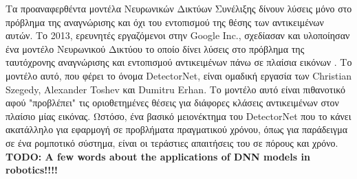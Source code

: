 Τα προαναφερθέντα μοντέλα Νευρωνικών Δικτύων Συνέλιξης δίνουν
λύσεις μόνο στο πρόβλημα της αναγνώρισης και όχι
του εντοπισμού της θέσης των αντικειμένων αυτών.
Το 2013, ερευνητές εργαζόμενοι στην Google Inc., σχεδίασαν και υλοποίησαν ένα
μοντέλο Νευρωνικού Δικτύου το οποίο δίνει λύσεις στο πρόβλημα της ταυτόχρονης
αναγνώρισης και εντοπισμού αντικειμένων πάνω σε πλαίσια εικόνων \cite{szegedy2013deep}.
Το μοντέλο αυτό, που φέρει το όνομα DetectorNet, είναι ομαδική εργασία των
Christian Szegedy, Alexander Toshev και Dumitru Erhan. Το μοντέλο αυτό είναι
πιθανοτικό αφού "προβλέπει" τις οριοθετημένες θέσεις για διάφορες κλάσεις
αντικειμένων στον πλαίσιο μίας εικόνας. Ωστόσο, ένα βασικό μειονέκτημα του DetectorNet
που το κάνει ακατάλληλο για εφαρμογή σε προβλήματα πραγματικού χρόνου, όπως
για παράδειγμα σε ένα ρομποτικό σύστημα, είναι οι τεράστιες απαιτήσεις του σε πόρους
και χρόνο.
\\

\textbf{TODO: A few words about the applications of DNN models in robotics!!!!}

%
%
